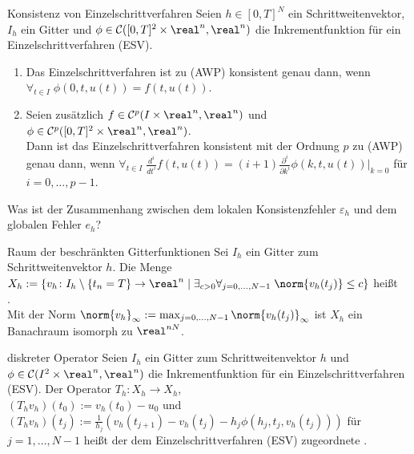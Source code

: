 \begin{Satz}{Konsistenz von Einzelschrittverfahren}
    Seien $h \in [0, T]^N$ ein Schrittweitenvektor,
    $I_h$ ein Gitter und $\phi \in \C([0, T]^2 \times \real^n, \real^n)$
    die Inkrementfunktion für ein Einzelschrittverfahren (ESV).
    \begin{enumerate}[label=(\emph{\roman*})]
        \item
        Das Einzelschrittverfahren ist zu (AWP) konsistent genau dann, wenn\\
        $\forall_{t \in I}\; \phi(0, t, u(t)) = f(t, u(t))$.

        \item
        Seien zusätzlich $f \in \C^p(I \times \real^n, \real^n)$ und
        $\phi \in \C^p([0, T]^2 \times \real^n, \real^n)$.\\
        Dann ist das Einzelschrittverfahren konsistent mit der Ordnung $p$
        zu (AWP) genau dann, wenn
        $\forall_{t \in I}\; \frac{d^i}{dt^i} f(t, u(t))
        = (i + 1) \frac{\partial^i}{\partial k^i} \phi(k, t, u(t))|_{k=0}$
        für $i = 0, \dotsc, p - 1$.
    \end{enumerate}
\end{Satz}

\linie

\begin{Bem}
    Was ist der Zusammenhang zwischen dem lokalen Konsistenzfehler
    $\varepsilon_h$ und dem globalen Fehler $e_h$?
\end{Bem}

\begin{Def}{Raum der beschränkten Gitterfunktionen}
    Sei $I_h$ ein Gitter zum Schrittweitenvektor $h$.
    Die Menge $X_h := \{v_h\colon I_h \setminus \{t_n = T\} \rightarrow
    \real^n \;|\; \exists_{c > 0} \forall_{j = 0, \dotsc, N - 1}\;
    \norm{v_h(t_j)} \le c\}$ heißt\\
    .\\
    Mit der Norm $\norm{v_h}_\infty :=
    \max_{j = 0, \dotsc, N - 1} \norm{v_h(t_j)}_\infty$
    ist $X_h$ ein Banachraum isomorph zu $\real^{nN}$.
\end{Def}

\begin{Def}{diskreter Operator}
    Seien $I_h$ ein Gitter zum Schrittweitenvektor $h$
    und $\phi \in \C(I^2 \times \real^n, \real^n)$
    die Inkrementfunktion für ein Einzelschrittverfahren (ESV).
    Der Operator $T_h\colon X_h \rightarrow X_h$,\\
    $(T_h v_h)(t_0) := v_h(t_0) - u_0$ und
    $(T_h v_h)(t_j) := \frac{1}{h_j} (v_h(t_{j+1}) - v_h(t_j) -
    h_j \phi(h_j, t_j, v_h(t_j)))$ für\\
    $j = 1, \dotsc, N - 1$
    heißt der dem Einzelschrittverfahren (ESV)
    zugeordnete .
\end{Def}

